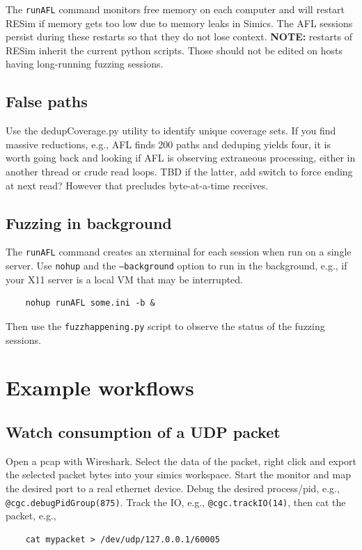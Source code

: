 \documentclass[titlepage]{article}
\begin{document}
The {\tt runAFL} command monitors free memory on each computer and will restart RESim if memory gets too low due to
memory leaks in Simics.  The AFL sessions persist during these restarts so that they do not lose context.  \textbf{NOTE:} restarts of RESim
inherit the current python scripts.  Those should not be edited on hosts having long-running fuzzing sessions.

\subsection{False paths}
Use the dedupCoverage.py utility to identify unique coverage sets.  If you find massive reductions, e.g., AFL finds 200 paths and
deduping yields four, it is worth going back and looking if AFL is observing extraneous processing, either in another thread or
crude read loops.  TBD if the latter, add switch to force ending at next read?  However that precludes byte-at-a-time receives.

\subsection{Fuzzing in background}
The {\tt runAFL} command creates an xterminal for each session when run on a single server.  Use {\tt nohup} and the {\tt --background} option to 
run in the background, e.g., if your X11 server is a local VM that may be interrupted.
\begin{verbatim}
    nohup runAFL some.ini -b &
\end{verbatim}
Then use the {\tt fuzzhappening.py} script to observe the status of the fuzzing sessions.

\section{Example workflows}
\label{example-workflows}
\subsection{Watch consumption of a UDP packet}
Open a pcap with Wireshark. Select the data of the packet, right click and export the selected packet bytes into your simics workspace.
Start the monitor and map the desired port to a real ethernet device.
Debug the desired process/pid, e.g., {\tt @cgc.debugPidGroup(875)}.  Track the IO, e.g., {\tt @cgc.trackIO(14)},
then cat the packet, e.g.,
\begin{verbatim}
    cat mypacket > /dev/udp/127.0.0.1/60005
\end{verbatim}
\end{document}
